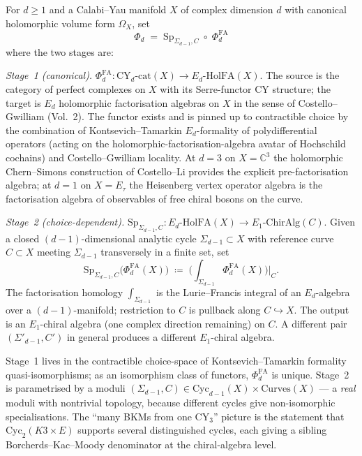 \begin{definition}
\label{def:two-stage-phi}
For $d\geq 1$ and a Calabi--Yau manifold $X$ of complex dimension $d$
with canonical holomorphic volume form $\Omega_X$, set
\[
\Phi_d \;=\; \mathrm{Sp}_{\Sigma_{d-1},C}\;\circ\;\Phi^{\mathrm{FA}}_d
\]
where the two stages are:

\emph{Stage~1 (canonical).} $\Phi^{\mathrm{FA}}_d:
\mathrm{CY}_d\text{-cat}(X) \longrightarrow
E_d\text{-}\mathrm{HolFA}(X)$. The source is the category of
perfect complexes on $X$ with its Serre-functor CY structure; the target
is $E_d$ holomorphic factorisation algebras on $X$ in the sense of
Costello--Gwilliam (Vol.~2). The functor exists and is pinned up to
contractible choice by the combination of Kontsevich--Tamarkin
$E_d$-formality of polydifferential operators (acting on the
holomorphic-factorisation-algebra avatar of Hochschild cochains) and
Costello--Gwilliam locality. At $d=3$ on $X=\mathbb{C}^3$ the
holomorphic Chern--Simons construction of Costello--Li provides the
explicit pre-factorisation algebra; at $d=1$ on $X=E_\tau$ the
Heisenberg vertex operator algebra is the factorisation algebra of
observables of free chiral bosons on the curve.

\emph{Stage~2 (choice-dependent).} $\mathrm{Sp}_{\Sigma_{d-1},C}:
E_d\text{-}\mathrm{HolFA}(X) \longrightarrow E_1\text{-}\mathrm{ChirAlg}(C)$.
Given a closed $(d-1)$-dimensional analytic cycle
$\Sigma_{d-1}\subset X$ with reference curve $C\subset X$ meeting
$\Sigma_{d-1}$ transversely in a finite set, set
\[
\mathrm{Sp}_{\Sigma_{d-1},C}\bigl(\Phi^{\mathrm{FA}}_d(X)\bigr)
\;\coloneqq\;
\biggl(\int_{\Sigma_{d-1}} \Phi^{\mathrm{FA}}_d(X)\biggr)\Big|_{C}.
\]
The factorisation homology $\int_{\Sigma_{d-1}}$ is the
Lurie--Francis integral of an $E_d$-algebra over a $(d-1)$-manifold;
restriction to $C$ is pullback along $C\hookrightarrow X$. The output is
an $E_1$-chiral algebra (one complex direction remaining) on $C$. A
different pair $(\Sigma'_{d-1},C')$ in general produces a different
$E_1$-chiral algebra.
\end{definition}

\begin{remark}
Stage~1 lives in the contractible choice-space of Kontsevich--Tamarkin
formality quasi-isomorphisms; as an isomorphism class of functors,
$\Phi^{\mathrm{FA}}_d$ is unique. Stage~2 is parametrised by a moduli
$(\Sigma_{d-1},C)\in \mathrm{Cyc}_{d-1}(X)\times\mathrm{Curves}(X)$ --- a
\emph{real} moduli with nontrivial topology, because different cycles
give non-isomorphic specialisations. The ``many BKMs from one
CY$_3$'' picture is the statement that $\mathrm{Cyc}_2(K3\times E)$
supports several distinguished cycles, each giving a sibling
Borcherds--Kac--Moody denominator at the chiral-algebra level.
\end{remark}

